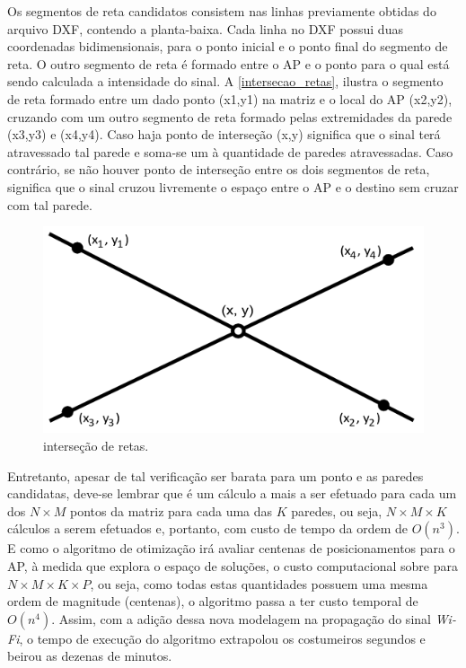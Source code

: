 \documentclass[
	12pt,				%
	openright,			%
	twoside,			%
	a4paper,			%
	english,			%
	french,				%
	spanish,			%
	brazil				%
	]{abntex2}
\begin{document}
Os segmentos de reta candidatos consistem nas linhas previamente obtidas do arquivo DXF, contendo a planta-baixa. Cada linha no DXF possui duas coordenadas bidimensionais, para o ponto inicial e o ponto final do segmento de reta. O outro segmento de reta é formado entre o AP e o ponto para o qual está sendo calculada a intensidade do sinal. A \autoref{intersecao_retas}, ilustra o segmento de reta formado entre um dado ponto (x1,y1) na matriz e o local do AP  (x2,y2), cruzando com um outro segmento de reta formado pelas extremidades da parede (x3,y3) e (x4,y4). Caso haja ponto de interseção (x,y) significa que o sinal terá atravessado tal parede e soma-se um à quantidade de paredes atravessadas. Caso contrário, se não houver ponto de interseção entre os dois segmentos de reta, significa que o sinal cruzou livremente o espaço entre o AP e o destino sem cruzar com tal parede. 
\begin{figure}[ht]
	\caption{\label{intersecao_retas}interseção de retas.}
	\begin{center}
		\includegraphics[scale=0.3]{images/inter.jpg}
	\end{center}
\end{figure}

Entretanto, apesar de tal verificação ser barata para um ponto e as paredes candidatas, deve-se lembrar que é um cálculo a mais a ser efetuado para cada um dos $N \times M$ pontos da matriz para cada uma das $ K $ paredes, ou seja, $N \times M \times K$ cálculos a serem efetuados e, portanto, com custo de tempo da ordem de $O(n^{3})$. E como o algoritmo de otimização irá avaliar centenas de posicionamentos para o AP, à medida que explora o espaço de soluções, o custo computacional sobre para $N \times M \times K \times P$, ou seja, como todas estas quantidades possuem uma mesma ordem de magnitude (centenas), o algoritmo passa a ter custo temporal de $O(n^{4})$. Assim, com a adição dessa nova modelagem na propagação do sinal \textit{Wi-Fi}, o tempo de execução do algoritmo extrapolou os costumeiros segundos e beirou as dezenas de minutos. 
\end{document}
